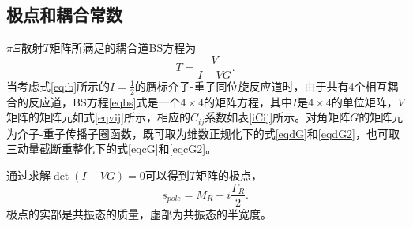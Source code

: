 \subsection{极点和耦合常数}
$\pi\Xi$散射$T$矩阵所满足的耦合道BS方程为
\begin{equation}
	\label{eqbs}
	T=\frac{V}{I-VG}.
\end{equation}
当考虑式\eqref{eqib}所示的$I=\frac{1}{2}$的赝标介子-重子同位旋反应道时，由于共有4个相互耦合的反应道，BS方程\eqref{eqbs}式是一个$4\times4$的矩阵方程，其中$I$是$4\times4$的单位矩阵，$V$矩阵的矩阵元如式\eqref{eqvij}所示，相应的$C_{ij}$系数如表\ref{iCij}所示。对角矩阵$G$的矩阵元为介子-重子传播子圈函数，既可取为维数正规化下的式\eqref{eqdG}和\eqref{eqdG2}，也可取三动量截断重整化下的式\eqref{eqcG}和\eqref{eqcG2}。\par
通过求解$\det(I-VG)=0$可以得到$T$矩阵的极点，
\begin{equation}
	s_{pole}=M_{R}+i\frac{\Gamma_{R}}{2}.
\end{equation}
极点的实部是共振态的质量，虚部为共振态的半宽度。\par
